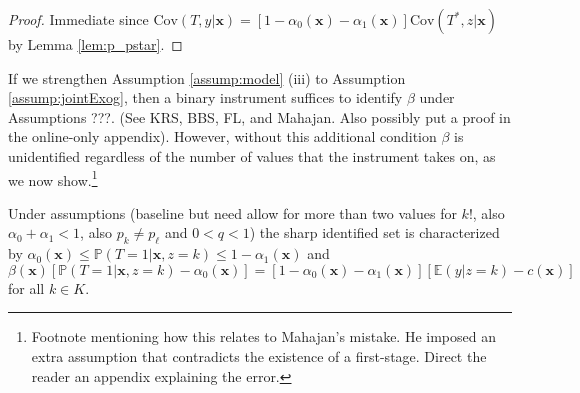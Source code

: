 \documentclass[12pt]{article}
\begin{document}
\begin{proof}
  Immediate since $\mbox{Cov}(T,y|\mathbf{x}) = \left[ 1 - \alpha_0(\mathbf{x}) - \alpha_1(\mathbf{x}) \right] \mbox{Cov}(T^*,z|\mathbf{x})$ by Lemma \ref{lem:p_pstar}.
\end{proof}

\noindent If we strengthen Assumption \ref{assump:model} (iii) to Assumption \ref{assump:jointExog}, then a binary instrument suffices to identify $\beta$ under Assumptions ???.
(See KRS, BBS, FL, and Mahajan. Also possibly put a proof in the online-only appendix).
However, without this additional condition $\beta$ is unidentified regardless of the number of values that the instrument takes on, as we now show.\footnote{Footnote mentioning how this relates to Mahajan's mistake. He imposed an extra assumption that contradicts the existence of a first-stage. Direct the reader an appendix explaining the error.}


\begin{thm}
  \label{thm:sharpI}
  Under assumptions (baseline but need allow for more than two values for $k$!, also $\alpha_0 + \alpha_1 < 1$, also $p_k \neq p_\ell$ and $0 < q <1$) the sharp identified set is characterized by $\alpha_0(\mathbf{x}) \leq \mathbb{P}(T=1|\mathbf{x}, z=k) \leq 1 -  \alpha_1(\mathbf{x})$ and
  \[
    \beta(\mathbf{x}) \left[ \mathbb{P}(T=1|\mathbf{x},z=k) - \alpha_0(\mathbf{x}) \right] = \left[1 - \alpha_0(\mathbf{x}) - \alpha_1(\mathbf{x})\right] \left[\mathbb{E}\left( y |z = k \right) - c(\mathbf{x})\right]
  \]
for all $k \in K$.
\end{thm}

\end{document}
